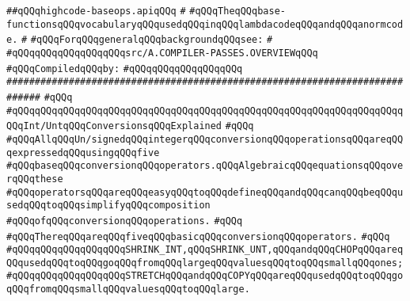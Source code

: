 \label{src/lib/compiler/back/top/highcode/highcode-baseops.api}
\verb|##qQQqhighcode-baseops.apiqQQq|\newline
\verb|#|\newline
\verb|#qQQqTheqQQqbase-functionsqQQqvocabularyqQQqusedqQQqinqQQqlambdacodeqQQqandqQQqanormcode.|\newline
\verb|#|\newline
\verb|#qQQqForqQQqgeneralqQQqbackgroundqQQqsee:|\newline
\verb|#|\newline
\verb|#qQQqqQQqqQQqqQQqqQQqsrc/A.COMPILER-PASSES.OVERVIEWqQQq|\newline
\newline
\verb|#qQQqCompiledqQQqby:|\newline
\verb|#qQQqqQQqqQQqqQQqqQQq|\newline
\newline
\newline
\newline
\verb|############################################################################|\newline
\verb|#qQQq|\newline
\verb|#qQQqqQQqqQQqqQQqqQQqqQQqqQQqqQQqqQQqqQQqqQQqqQQqqQQqqQQqqQQqqQQqqQQqqQQqInt/UntqQQqConversionsqQQqExplained|\newline
\verb|#qQQq|\newline
\verb|#qQQqAllqQQqUn/signedqQQqintegerqQQqconversionqQQqoperationsqQQqareqQQqexpressedqQQqusingqQQqfive|\newline
\verb|#qQQqbaseqQQqconversionqQQqoperators.qQQqAlgebraicqQQqequationsqQQqoverqQQqthese|\newline
\verb|#qQQqoperatorsqQQqareqQQqeasyqQQqtoqQQqdefineqQQqandqQQqcanqQQqbeqQQqusedqQQqtoqQQqsimplifyqQQqcomposition|\newline
\verb|#qQQqofqQQqconversionqQQqoperations.|\newline
\verb|#qQQq|\newline
\verb|#qQQqThereqQQqareqQQqfiveqQQqbasicqQQqconversionqQQqoperators.|\newline
\verb|#qQQq|\newline
\verb|#qQQqqQQqqQQqqQQqqQQqSHRINK_INT,qQQqSHRINK_UNT,qQQqandqQQqCHOPqQQqareqQQqusedqQQqtoqQQqgoqQQqfromqQQqlargeqQQqvaluesqQQqtoqQQqsmallqQQqones;|\newline
\verb|#qQQqqQQqqQQqqQQqqQQqSTRETCHqQQqandqQQqCOPYqQQqareqQQqusedqQQqtoqQQqgoqQQqfromqQQqsmallqQQqvaluesqQQqtoqQQqlarge.|\newline
